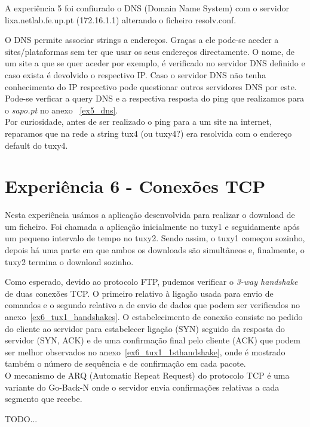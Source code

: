 \documentclass[11pt,a4paper,reqno]{report}
\numberwithin{equation}{section}
\begin{document}
A experiência 5 foi confiurado o DNS (Domain Name System) com o servidor lixa.netlab.fe.up.pt (172.16.1.1) alterando o ficheiro resolv.conf.

O DNS permite associar strings a endereços. Graças a ele pode-se aceder a sites/plataformas sem ter que usar os seus endereços directamente. O nome, de um site a que se quer aceder por exemplo, é verificado no servidor DNS definido e caso exista é devolvido o respectivo IP. Caso o servidor DNS não tenha conhecimento do IP respectivo pode questionar outros servidores DNS por este. \\

Pode-se verficar a query DNS e a respectiva resposta do ping que realizamos para o \emph{sapo.pt} no anexo ~\ref{ex5_dns}.\\

Por curiosidade, antes de ser realizado o ping para a um site na internet, reparamos que na rede a string tux4 (ou tuxy4?) era resolvida com o endereço default do tuxy4.

\section{Experiência 6 - Conexões TCP}

Nesta experiência usámos a aplicação desenvolvida para realizar o download de um ficheiro. Foi chamada a aplicação inicialmente no tuxy1 e seguidamente após um pequeno intervalo de tempo no tuxy2. Sendo assim, o tuxy1 começou sozinho, depois há uma parte em que ambos os downloads são simultâneos e, finalmente, o tuxy2 termina o download sozinho.

Como esperado, devido ao protocolo FTP, pudemos verificar o \emph{3-way handshake} de duas conexões TCP. O primeiro relativo à ligação usada para envio de comandos e o segundo relativo a de envio de dados que podem ser verificados no anexo~\ref{ex6_tux1_handshakes}. O estabelecimento de conexão consiste no pedido do cliente ao servidor para estabelecer ligação (SYN) seguido da resposta do servidor (SYN, ACK) e de uma confirmação final pelo cliente (ACK) que podem ser melhor observados no anexo~\ref{ex6_tux1_1sthandshake}, onde é mostrado também o número de sequência e de confirmação em cada pacote. \\

O mecanismo de ARQ (Automatic Repeat Request) do protocolo TCP é uma variante do Go-Back-N onde o servidor envia confirmações relativas a cada segmento que recebe.

TODO...\\
\end{document}
